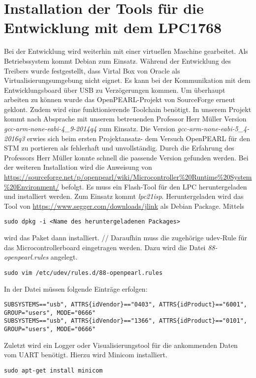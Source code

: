 \section{Installation der Tools für die Entwicklung mit dem LPC1768}
Bei der Entwicklung wird weiterhin mit einer virtuellen Maschine gearbeitet. Als Betriebssystem kommt Debian zum Einsatz. Während der Entwicklung des Treibers wurde festgestellt, dass Virtal Box von Oracle als Virtualisierungsumgebung nicht eignet. Es kann bei der Kommunikation mit dem Entwicklungsboard über USB zu Verzögerungen kommen.
Um überhaupt arbeiten zu können wurde das OpenPEARL-Projekt von SourceForge erneut geklont. Zudem wird eine funktionierende Toolchain benötigt. In unserem Projekt kommt nach Absprache mit unserem betreuenden Professor Herr Müller Version {\textit{gcc-arm-none-eabi-4\_9-2014q4}}
 zum Einsatz. 
Die Version {\textit{gcc-arm-none-eabi-5\_4-2016q3}}
 erwies sich beim ersten Projektansatz- dem Versuch OpenPEARL für den STM zu portieren als fehlerhaft und unvollständig. Durch die Erfahrung des Professors Herr Müller konnte schnell die passende Version gefunden werden.
Bei der weiteren Installation wird die Anweisung von \url{https://sourceforge.net/p/openpearl/wiki/Microcontroller%20Runtime%20System%20Environment/} befolgt. Es muss ein Flash-Tool für den LPC heruntergeladen und installiert werden. Zum Einsatz kommt \textit{lpc21isp}. Heruntergeladen wird das Tool von \url{https://www.segger.com/downloads/jlink} als Debian Package. Mittels 
\begin{lstlisting}
sudo dpkg -i <Name des heruntergeladenen Packages>
\end{lstlisting}
wird das Paket dann installiert. //
Daraufhin muss die zugehörige udev-Rule für das Microcontrollerboard eingetragen werden. Dazu wird die Datei \textit{88-openpearl.rules} angelegt.
\begin{lstlisting}
sudo vim /etc/udev/rules.d/88-openpearl.rules
\end{lstlisting}
In der Datei müssen folgende Einträge erfolgen:
\begin{lstlisting}
SUBSYSTEMS=="usb", ATTRS{idVendor}=="0403", ATTRS{idProduct}=="6001", GROUP="users", MODE="0666"
SUBSYSTEMS=="usb", ATTRS{idVendor}=="1366", ATTRS{idProduct}=="0101", GROUP="users", MODE="0666"
\end{lstlisting}
Zuletzt wird ein Logger oder Visualisierungstool für die ankommenden Daten vom UART benötigt. Hierzu wird Minicom installiert.
\begin{lstlisting}
sudo apt-get install minicom
\end{lstlisting}

